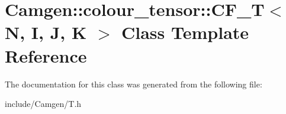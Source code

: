 \hypertarget{a00040}{\section{Camgen\-:\-:colour\-\_\-tensor\-:\-:C\-F\-\_\-\-T$<$ N, I, J, K $>$ Class Template Reference}
\label{a00040}
}


The documentation for this class was generated from the following file\-:\begin{DoxyCompactItemize}
\item 
include/\-Camgen/T.\-h\end{DoxyCompactItemize}
